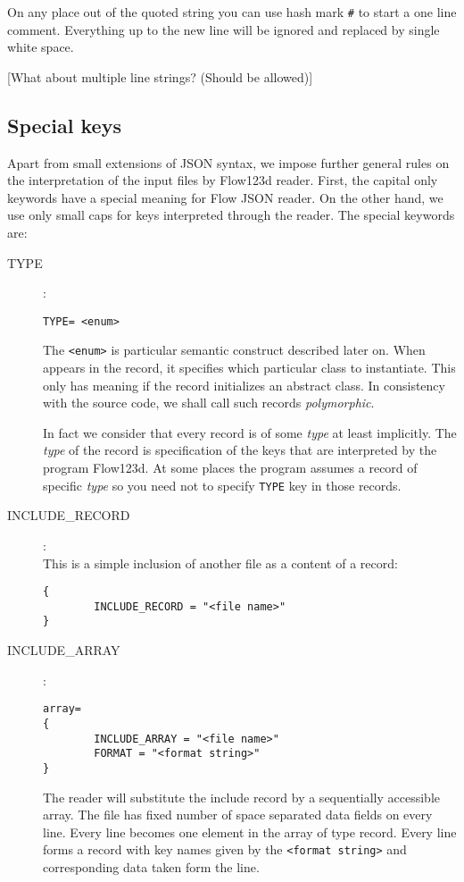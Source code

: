 On any place out of the quoted string you can use hash mark \verb'#' 
to start a one line comment. Everything up to the new line will be ignored and replaced by single white space.

[What about multiple line strings? (Should be allowed)]

\subsection{Special keys}
Apart from small extensions of JSON syntax, we impose further general rules on the interpretation of the input files by Flow123d reader.
First, the capital only keywords  
have a special meaning for Flow JSON reader. On the other hand, we use only small caps for keys interpreted through the reader.
The special keywords are:
\begin{description}

\item[TYPE]:\\ 
\begin{verbatim}
TYPE= <enum>
\end{verbatim}
The \verb'<enum>' is particular semantic construct described later on. 
When appears in the record, it specifies which particular class to instantiate. This only has meaning if the record initializes
an abstract class. In consistency with the source code, we shall call such records {\it polymorphic}. 


In fact we consider
that every record is of some {\it type} at least implicitly. The {\it type} of the record is specification of the keys that are
interpreted by the program Flow123d. At some places the program assumes a record of specific {\it type} so you need not to specify 
\verb'TYPE' key in those records.

\item[INCLUDE\_RECORD]:\\
This is a simple inclusion of another file as a content of a record:
\begin{verbatim}
{
        INCLUDE_RECORD = "<file name>"
}
\end{verbatim}

\item[INCLUDE\_ARRAY]:\\
\begin{verbatim}
array=
{
        INCLUDE_ARRAY = "<file name>"
        FORMAT = "<format string>"
}       
\end{verbatim}
The reader will substitute the include record by a sequentially accessible array. The file has fixed number of 
space separated data fields on every line. Every line becomes one element in the array of type record. Every line forms a 
record with key names given by the \verb'<format string>' 
and corresponding data taken form the line.


\end{description}

